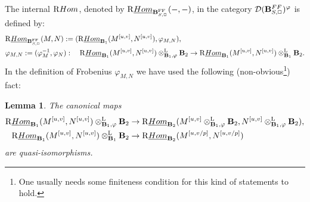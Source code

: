 \documentclass[10pt,reqno]{amsart}
\newtheorem{lemma}[equation]{Lemma}
\theoremstyle{definition}
\theoremstyle{remark}
\def\phi{\varphi}
\newcommand{\Hom}{{\rm{Hom}} }
\newcommand{\uHom}{\underline{{\rm{Hom}} }}
\newcommand{\LL}{\operatorname{L} }
\newcommand{\FF}{\operatorname{FF} }
\newcommand{\sd}{{\mathcal{D}}}
\numberwithin{equation}{section}
\def\R{{\mathrm R}}
\def\rhom{$\R\uHom$}
\numberwithin{equation}{section}
\begin{document}
    The  internal $\R\Hom$,   denoted \index{rhom@\rhom}by $\R\uHom_{\B^{\FF}_{S,\Box}}(-,-)$, in 
 the category  ${\sd}(\B^{\rm FF}_{S,\Box})^{\phi}$  is defined by: 
    \begin{align*}
    &\R\uHom_{\B^{\FF}_{S,\Box}}(M,N):=( \R\uHom_{\B_1}(M^{[u,v]},N^{[u,v]}),\phi_{M,N}),\\
    & \phi_{M,N}:= (\phi_{M}^{-1},\phi_N):\quad \R\uHom_{\B_1}(M^{[u,v]},N^{[u,v]}) \otimes^{\LL}_{\B_1,\phi}\B_2\to 
    \R\uHom_{\B_1}(M^{[u,v]},N^{[u,v]})\otimes^{\LL}_{\B_1}\B_2.
    \end{align*}
    In the definition of Frobenius $\phi_{M,N}$ we have used the following (non-obvious\footnote{One
usually needs some finiteness condition for this kind of statements to hold.}) 
fact:
    \begin{lemma}\label{fun1-kol}
The canonical maps 
    \begin{align*}
    \R\uHom_{\B_1}(M^{[u,v]},N^{[u,v]}) \otimes^{\LL}_{\B_1,\phi}\B_2 & \to
    \R\uHom_{\B_2}(M^{[u,v]} \otimes^{\LL}_{\B_1,\phi}\B_2,N^{[u,v]} \otimes^{\LL}_{\B_1,\phi}\B_2),\\
    \R\uHom_{\B_1}(M^{[u,v]},N^{[u,v]})\otimes^{\LL}_{\B_1}\B_2 & \to \R\uHom_{\B_2}(M^{[u,v/p]},N^{[u,v/p]})
    \end{align*}
    are quasi-isomorphisms. 
    \end{lemma}
\end{document}
